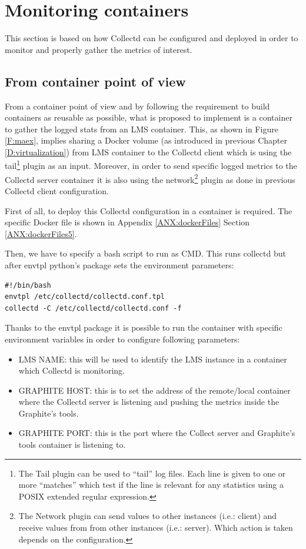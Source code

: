 \section{Monitoring containers}

This section is based on how Collectd can be configured and deployed in order to monitor and properly gather the metrics of interest.

\subsection{From container point of view}

From a container point of view and by following the requirement to build containers as reusable as possible, what is proposed to implement is a container to gather the logged stats from an LMS container. This, as shown in Figure \ref{F:maex}, implies sharing a Docker volume (as introduced in previous Chapter \ref{D:virtualization}) from LMS container to the Collectd client which is using the tail\footnote{The Tail plugin can be used to “tail” log files. Each line is given to one or more “matches” which test if the line is relevant for any statistics using a POSIX extended regular expression.} plugin as an input. Moreover, in order to send specific logged metrics to the Collectd server container it is also using the network\footnote{The Network plugin can send values to other instances (i.e.: client) and receive values from from other instances (i.e.: server). Which action is taken depends on the configuration.} plugin as done in previous Collectd client configuration.

First of all, to deploy this Collectd configuration in a container is required. The specific Docker file is shown in Appendix \ref{ANX:dockerFiles} Section \ref{ANX:dockerFiles5}.

Then, we have to specify a bash script to run as CMD. This runs collectd but after envtpl python's package sets the environment parameters:
\begin{verbatim}
#!/bin/bash
envtpl /etc/collectd/collectd.conf.tpl
collectd -C /etc/collectd/collectd.conf -f
\end{verbatim}

Thanks to the envtpl package it is possible to run the container with specific environment variables in order to configure following parameters:

\begin{itemize}
\item LMS NAME: this will be used to identify the LMS instance in a container which Collectd is monitoring.
\item GRAPHITE HOST: this is to set the address of the remote/local container where the Collectd server is listening and pushing the metrics inside the Graphite's tools.
\item GRAPHITE PORT: this is the port where the Collect server and Graphite's tools container is listening to.
\end{itemize}

